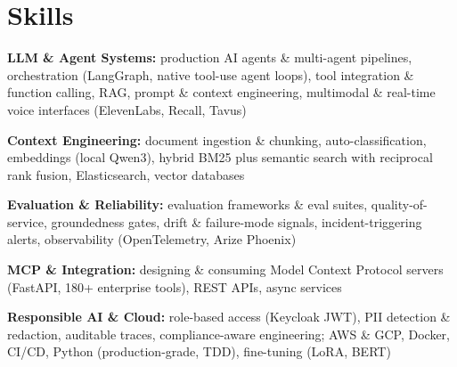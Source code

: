 \documentclass[10pt,a4paper]{article}
\begin{document}
\section{Skills}
\begin{tight}
  \item[\textcolor{accent}{\small$\bullet$}] \textbf{LLM \& Agent Systems:} production AI agents \& multi-agent pipelines, orchestration (LangGraph, native tool-use agent loops), tool integration \& function calling, RAG, prompt \& context engineering, multimodal \& real-time voice interfaces (ElevenLabs, Recall, Tavus)
  \item[\textcolor{accent}{\small$\bullet$}] \textbf{Context Engineering:} document ingestion \& chunking, auto-classification, embeddings (local Qwen3), hybrid BM25 plus semantic search with reciprocal rank fusion, Elasticsearch, vector databases
  \item[\textcolor{accent}{\small$\bullet$}] \textbf{Evaluation \& Reliability:} evaluation frameworks \& eval suites, quality-of-service, groundedness gates, drift \& failure-mode signals, incident-triggering alerts, observability (OpenTelemetry, Arize Phoenix)
  \item[\textcolor{accent}{\small$\bullet$}] \textbf{MCP \& Integration:} designing \& consuming Model Context Protocol servers (FastAPI, 180+ enterprise tools), REST APIs, async services
  \item[\textcolor{accent}{\small$\bullet$}] \textbf{Responsible AI \& Cloud:} role-based access (Keycloak JWT), PII detection \& redaction, auditable traces, compliance-aware engineering; AWS \& GCP, Docker, CI/CD, Python (production-grade, TDD), fine-tuning (LoRA, BERT)
\end{tight}

\end{document}
